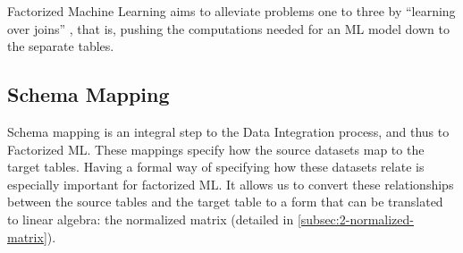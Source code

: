 Factorized Machine Learning aims to alleviate problems one to three by “learning over joins” \cite{orion_learning_gen_lin_models}, that is, pushing the computations needed for an ML model down to the separate tables.

\subsection{Schema Mapping}
Schema mapping is an integral step to the Data Integration process, and thus to Factorized ML. These mappings specify how the source datasets map to the target tables. Having a formal way of specifying how these datasets relate is especially important for factorized ML. It allows us to convert these relationships between the source tables and the target table to a form that can be translated to linear algebra: the normalized matrix (detailed in \autoref{subsec:2-normalized-matrix}).

